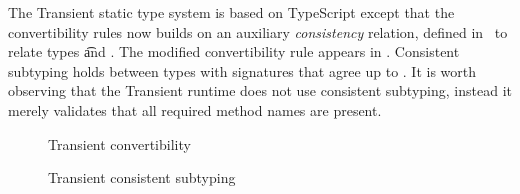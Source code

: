 \documentclass[acmsmall, anonymous, authordraft, review]{acmart} %
\begin{document}
The Transient static type system is based on TypeScript except that the
convertibility rules now builds on an auxiliary \emph{consistency} relation,
defined in~ to relate types \t and \tp. The modified
convertibility rule appears in . Consistent subtyping holds
between types with signatures that agree up to \any.  It is worth observing
that the Transient runtime does not use consistent subtyping, instead
it merely validates that all required method names are present.

\begin{figure}[!t]
\hrulefill
\vspace{-4mm}

\begin{mathpar}
\end{mathpar}
\vspace{-6mm}

\hrulefill
\caption{Transient convertibility}\label{convtp}


\hrulefill
\small\vspace{-4mm}

\begin{mathpar} 





\end{mathpar}

\hrulefill
\caption{Transient consistent subtyping}\label{subtp}

\hrulefill
\vspace{1mm}


\end{figure}
\end{document}

